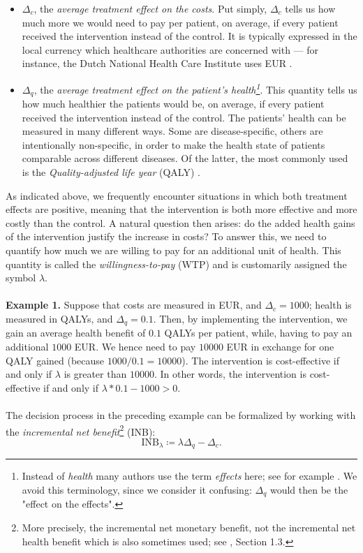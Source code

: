 \documentclass[aoas,preprint]{imsart}
\theoremstyle{plain}
\theoremstyle{definition}
\theoremstyle{remark}
\theoremstyle{remark}
\begin{document}
\begin{itemize}
    \item $\Delta_c$, the \emph{average treatment effect on the costs}. Put simply, $\Delta_c$ tells us how much more we would need to pay per patient, on average, if every patient received the intervention instead of the control. It is typically expressed in the local currency which healthcare authorities are concerned with --- for instance, the Dutch National Health Care Institute uses EUR \citep{hakkaart2015costing}.
    \item $\Delta_q$, the \emph{average treatment effect on the patient's health\footnote{Instead of \emph{health} many authors use the term \emph{effects} here; see for example \citet{drummond2015methods}. We avoid this terminology, since we consider it confusing: $\Delta_q$ would then be the "effect on the effects".}}. This quantity tells us how much healthier the patients would be, on average, if every patient received the intervention instead of the control. The patients' health can be measured in many different ways. Some are disease-specific, others are intentionally non-specific, in order to make the health state of patients comparable across different diseases. Of the latter, the most commonly used is the \emph{Quality-adjusted life year} (QALY) \citep{drummond2015methods}.
\end{itemize}
As indicated above, we frequently encounter situations in which both treatment effects are positive, meaning that the intervention is both more effective and more costly than the control. A natural question then arises: do the added health gains of the intervention justify the increase in costs? To answer this, we need to quantify how much we are willing to pay for an additional unit of health. This quantity is called the \emph{willingness-to-pay} (WTP) and is customarily assigned the symbol $\lambda$.
\\~\\
\textbf{Example 1.} Suppose that costs are measured in EUR, and $\Delta_c = 1000$; health is measured in QALYs, and $\Delta_q = 0.1$. Then, by implementing the intervention, we gain an average health benefit of $0.1$ QALYs per patient, while, having to pay an additional $1000$ EUR. We hence need to pay $10000$ EUR in exchange for one QALY gained (because $1000/0.1=10000$). The intervention is cost-effective if and only if $\lambda$ is greater than $10000$. In other words, the intervention is cost-effective if and only if $\lambda * 0.1 - 1000 > 0$.
\\~\\
The decision process in the preceding example can be formalized by working with the \emph{incremental net benefit}\footnote{More precisely, the incremental net monetary benefit, not the incremental net health benefit which is also sometimes used; see \citet{willan2006statistical}, Section 1.3.} (INB):
$$
\text{INB}_{\lambda} \coloneqq \lambda \Delta_q - \Delta_c.
$$
\end{document}
